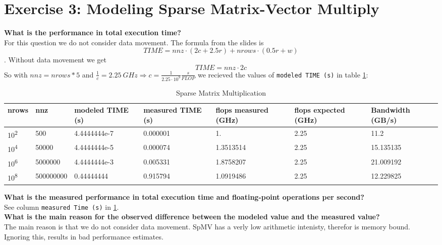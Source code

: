 \documentclass[a4paper,10pt]{article}
\begin{document}
\section{Exercise 3: Modeling Sparse Matrix-Vector Multiply}
\textbf{What is the performance in total execution time?}\\
For this question we do not consider data movement.
The formula from the slides is 
$$TIME = nnz \cdot (2c + 2.5r) + nrows \cdot (0.5r + w)$$.
Without data movement we get
$$TIME = nnz \cdot 2c$$
So with \(nnz = nrows * 5\) and
$\frac{1}{c} = 2.25\ GHz \Rightarrow c = \frac{1}{2.25 \cdot 10^9}\frac{s}{FLOP}$
we recieved the values of \verb|modeled TIME (s)| in table \ref{tab:spmm}:

\renewcommand{\arraystretch}{1.2}

\begin{table}[H]
\centering
\begin{tabular}{|p{1cm}|p{1.4cm}|p{2cm}|p{1.4cm}|p{2cm}|p{1.4cm}|p{1.6cm}|}
\hline
nrows & nnz & modeled TIME (s) & measured TIME (s) & flops measured (GHz) & flops expected (GHz) & Bandwidth (GB/s)\\
\hline
10\textsuperscript{2} & 500 & 4.4444444e-7 & 0.000001 & 1. & 2.25 & 11.2\\
10\textsuperscript{4} & 50000 & 4.4444444e-5 & 0.000074 & 1.3513514 & 2.25 & 15.135135\\
10\textsuperscript{6} & 5000000 & 4.4444444e-3 & 0.005331 & 1.8758207 & 2.25 & 21.009192\\
10\textsuperscript{8} & 500000000 & 0.44444444 & 0.915794 & 1.0919486 & 2.25 & 12.229825\\
\hline
\end{tabular}
\caption{Sparse Matrix Multiplication}
\label{tab:spmm}
\end{table}

\textbf{What is the measured performance in total execution time and floating-point operations per second?}\\
See column \verb|measured Time (s)| in \ref{tab:spmm}.\\

\textbf{What is the main reason for the observed difference between the modeled value and the measured value?}\\
The main reason is that we do not consider data movement. SpMV has a verly low arithmetic intenisty, therefor is memory bound.
Ignoring this, results in bad performance estimates.\\
\end{document}
